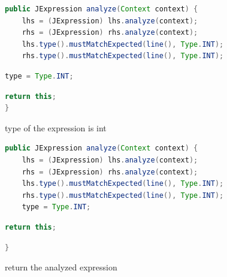 \documentclass[8pt,a4paper,compress]{beamer}
\begin{document}
\begin{frame}[fragile]
\begin{overprint}
\begin{tcolorbox}[enhanced,drop shadow southwest,sharp corners,size=fbox,colback=white,fontlower=\small\ttfamily,collower=silver900]
\begin{lstlisting}[language=Java,style=focusout]
public JExpression analyze(Context context) {
    lhs = (JExpression) lhs.analyze(context);
    rhs = (JExpression) rhs.analyze(context);
    lhs.type().mustMatchExpected(line(), Type.INT);
    rhs.type().mustMatchExpected(line(), Type.INT);
\end{lstlisting}
\begin{lstlisting}[language=Java,style=focusin,backgroundcolor=\color{lime100}]
    type = Type.INT;
\end{lstlisting}
\begin{lstlisting}[language=Java,style=focusout]
    return this;
}
\end{lstlisting}

\tcblower
\begin{minipage}[t][.2cm][t]{\textwidth}
type of the expression is int
\end{minipage}
\end{tcolorbox}

\begin{tcolorbox}[enhanced,drop shadow southwest,sharp corners,size=fbox,colback=white,fontlower=\small\ttfamily,collower=silver900]
\begin{lstlisting}[language=Java,style=focusout]
public JExpression analyze(Context context) {
    lhs = (JExpression) lhs.analyze(context);
    rhs = (JExpression) rhs.analyze(context);
    lhs.type().mustMatchExpected(line(), Type.INT);
    rhs.type().mustMatchExpected(line(), Type.INT);
    type = Type.INT;
\end{lstlisting}
\begin{lstlisting}[language=Java,style=focusin,backgroundcolor=\color{lime100}]
    return this;
\end{lstlisting}
\begin{lstlisting}[language=Java,style=focusout]
}
\end{lstlisting}

\tcblower
\begin{minipage}[t][.2cm][t]{\textwidth}
return the analyzed expression
\end{minipage}
\end{tcolorbox}

\end{overprint}
\end{frame}
\end{document}
